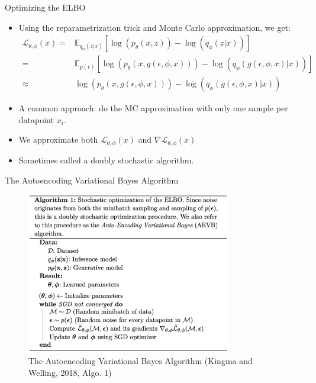 \documentclass[10pt]{beamer}
\begin{document}
\begin{frame}{Optimizing the ELBO}

\begin{itemize}
\item Using the reparametrization trick and Monte Carlo approximation, we get:
\begin{align*}
\mathcal{L}_{\theta,\phi}(x) =& \mathbb{E}_{q_\phi(z|x)}\left[\log \left(p_\theta(x,z)\right)- \log(q_\phi(z|x))\right]\\
 =& \mathbb{E}_{p(\epsilon)}\left[\log \left(p_\theta(x,g(\epsilon, \phi, x))\right)- \log(q_\phi(g(\epsilon, \phi, x)|x))\right]\\
 \approx & \log \left(p_\theta(x,g(\epsilon, \phi, x))\right)- \log(q_\phi(g(\epsilon, \phi, x)|x))
\end{align*}
\pause
\item A common approach: do the MC approximation with only {\color{uured}one sample per datapoint $x_i$}.\pause
\item We approximate both $\mathcal{L}_{\theta,\phi}(x)$ and $\nabla\mathcal{L}_{\theta,\phi}(x)$
\pause
\item Sometimes called a {\color{uured}doubly stochastic} algorithm.
\end{itemize}

\end{frame}


\begin{frame}{The Autoencoding Variational Bayes Algorithm}

\begin{figure}[h]
\centering
\includegraphics[width=0.8\textwidth]{fig/Kingma_Welling_2018_Algo_1.png}
\caption{The Autoencoding Variational Bayes Algorithm (Kingma and Welling, 2018, Algo. 1)}
\end{figure}

\end{frame}
\end{document}
